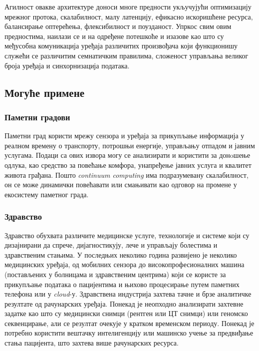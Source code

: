 Агилност овакве архитектуре доноси многе предности укључујући  оптимизацију мрежног протока, скалабилност, малу латенцију, ефикасно искоришћене ресурса, балансирање оптерећења, флексибилност и поузданост. Упркос свим овим предностима, наилази се и на одређене потешкоће и изазове као што су међусобна комуникација уређаја различитих произвођача који функционишу служећи се различитим семнатичким правилима, сложеност управљања великог броја уређаја и синхорнизација података.

\pagebreak
\subsection{Могуће примене}

\subsubsection{Паметни градови}

Паметни град користи мрежу сензора и уређаја за прикупљање информација у реалном времену о транспорту, потрошњи енергије, управљању отпадом и јавним услугама. Подаци са ових извора могу се анализирати и користити за донoшење одлука, као средство за повећање комфора, унапређење јавних услуга и квалитет живота грађана. Пошто \textit{continuum computing} има подразумевану скалабилност, он се  може динамички повећавати или смањивати као одговор на промене у екосистему паметног града.

\subsubsection{Здравство}

Здравство обухвата различите медицинске услуге, технологије и системе који су дизајнирани да спрече, дијагностикују, лече и управљају болестима и здравственим стањима. У последњих неколико година развијено је  неколико медицинских уређаја, од мобилних сензора до високопрофесионалних машина (постављених у болницама и здравственим центрима) који се користе за прикупљање података о пацијентима и њихово процесирање путем паметних телефона или у \textit{cloud}-у. Здравствена индустрија захтева тачне и брзе аналитичке резултате од рачунарских уређаја. Понекад је неопходно анализирати захтевне задатке као што су медицински снимци (рентген или ЦТ снимци) или геномско секвенцирање, али се резултат очекује у кратком временском периоду. Понекад је потребно користити вештачку интелигенцију или машинско учење за предвиђање стања пацијента, што захтева више рачунарских ресурса.